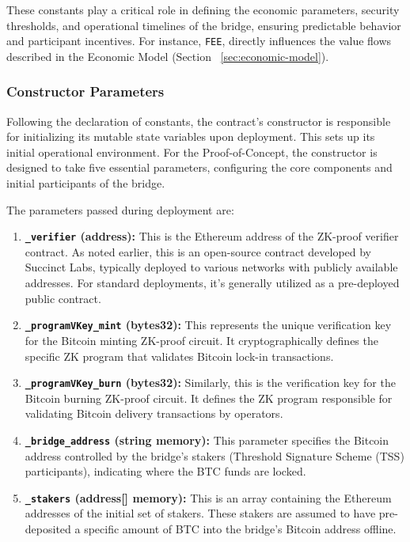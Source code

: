 \documentclass{DESSThesis}
\begin{document}
These constants play a critical role in defining the economic parameters, security thresholds, and operational timelines of the bridge, ensuring predictable behavior and participant incentives. For instance, \texttt{FEE}, directly influences the value flows described in the Economic Model (Section ~\ref{sec:economic-model}).

\subsubsection{Constructor Parameters}
Following the declaration of constants, the contract's constructor is responsible for initializing its mutable state variables upon deployment. This sets up its initial operational environment. For the Proof-of-Concept, the constructor is designed to take five essential parameters, configuring the core components and initial participants of the bridge.

The parameters passed during deployment are:
\begin{enumerate}
    \item \textbf{\texttt{\_verifier} (address):} This is the Ethereum address of the ZK-proof verifier contract. As noted earlier, this is an open-source contract developed by Succinct Labs, typically deployed to various networks with publicly available addresses. For standard deployments, it's generally utilized as a pre-deployed public contract.
    \item \textbf{\texttt{\_programVKey\_mint} (bytes32):} This represents the unique verification key for the Bitcoin minting ZK-proof circuit. It cryptographically defines the specific ZK program that validates Bitcoin lock-in transactions.
    \item \textbf{\texttt{\_programVKey\_burn} (bytes32):} Similarly, this is the verification key for the Bitcoin burning ZK-proof circuit. It defines the ZK program responsible for validating Bitcoin delivery transactions by operators.
    \item \textbf{\texttt{\_bridge\_address} (string memory):} This parameter specifies the Bitcoin address controlled by the bridge's stakers (Threshold Signature Scheme (TSS) participants), indicating where the BTC funds are locked.
    \item \textbf{\texttt{\_stakers} (address[] memory):} This is an array containing the Ethereum addresses of the initial set of stakers. These stakers are assumed to have pre-deposited a specific amount of BTC into the bridge's Bitcoin address offline.
\end{enumerate}
\end{document}
